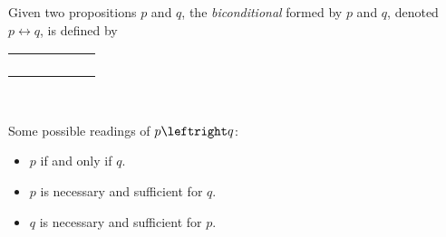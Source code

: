 \newpage

\begin{definition}[Biconditional]
    \begin{center}
        \begin{minipage}[t]{.55\linewidth}
            Given two propositions $p$ and $q$, the \emph{biconditional} formed by $p$ and $q$,
            denoted $p \leftrightarrow q$, is defined by
            \begin{table}[H]
                \centering
                \label{tab:iff}
                \begin{tabular}{|CcCc||Cc|}
                    \hline
                     &  &  \\ \hline
                    \thead{$\top$} & \thead{$\top$} &  \\
                    \thead{$\top$} & \thead{$\bot$} &  \\
                    \thead{$\bot$} & \thead{$\top$} &  \\
                    \thead{$\bot$} & \thead{$\bot$} &  \\ \hline
                \end{tabular}
            \end{table}
        \end{minipage}%
        \begin{minipage}[t]{.05\linewidth}
            ~
        \end{minipage}%
        \begin{minipage}[t]{.4\linewidth}
            Some possible readings of $p \leftright q$:\\
            \begin{itemize}
                \item[\cdot]
                    $p$ if and only if $q$.
                \item[\cdot]
                    $p$ is necessary and sufficient for $q$.
                \item[\cdot]
                    $q$ is necessary and sufficient for $p$.
            \end{itemize}
        \end{minipage}
    \end{center}
\end{definition}

